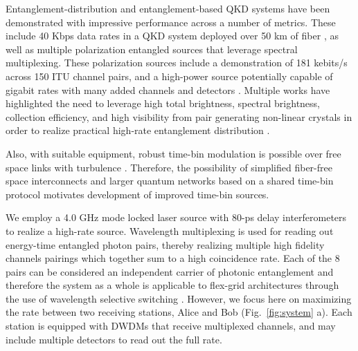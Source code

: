 \documentclass[11pt]{caltech_thesis} %
\begin{document}
Entanglement-distribution and entanglement-based QKD systems have been
demonstrated with impressive performance across a number of metrics.
These include 40 Kbps data rates in a QKD system deployed over 50 km of
fiber \autocite{Pelet2022}, as well as multiple polarization entangled
sources that leverage spectral multiplexing. These polarization sources
include a demonstration of 181 kebits/s across 150 ITU channel pairs,
and a high-power source potentially capable of gigabit rates with many
added channels and detectors
\autocite{Alshowkan2022,Neumann2022Entanglement}. Multiple works have
highlighted the need to leverage high total brightness, spectral
brightness, collection efficiency, and high visibility from pair
generating non-linear crystals in order to realize practical high-rate
entanglement distribution \autocite{Neumann2022Entanglement}.

Also, with suitable equipment, robust time-bin modulation is possible
over free space links with turbulence \autocite{Jin2019}. Therefore, the
possibility of simplified fiber-free space interconnects and larger
quantum networks based on a shared time-bin protocol motivates
development of improved time-bin sources.

We employ a 4.0 GHz mode locked laser source with 80-ps delay
interferometers to realize a high-rate source. Wavelength multiplexing
is used for reading out energy-time entangled photon pairs, thereby
realizing multiple high fidelity channels pairings which together sum to
a high coincidence rate. Each of the 8 pairs can be considered an
independent carrier of photonic entanglement \autocite{Wengerowsky2018}
and therefore the system as a whole is applicable to flex-grid
architectures through the use of wavelength selective switching
\autocite{Appas2021,Alshowkan22Switching}. However, we focus here on
maximizing the rate between two receiving stations, Alice and Bob
(Fig.~\ref{fig:system} a). Each station is equipped with DWDMs that
receive multiplexed channels, and may include multiple detectors to read
out the full rate.
\end{document}
